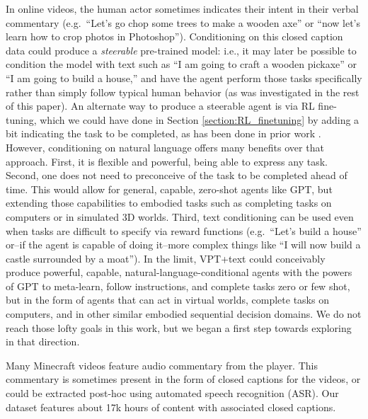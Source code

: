 In online videos, the human actor sometimes indicates their intent in their verbal commentary (e.g.\ ``Let's go chop some trees to make a wooden axe'' or ``now let's learn how to crop photos in Photoshop''). Conditioning on this closed caption data could produce a \emph{steerable} pre-trained model: i.e., it may later be possible to condition the model with text such as ``I am going to craft a wooden pickaxe'' or ``I am going to build a house,'' and have the agent perform those tasks specifically rather than simply follow typical human behavior (as was investigated in the rest of this paper). An alternate way to produce a steerable agent is via RL fine-tuning, which we could have done in Section \ref{section:RL_finetuning} by adding a bit indicating the task to be completed, as has been done in prior work \cite{kanitscheider2021multi}. However, conditioning on natural language offers many benefits over that approach. First, it is flexible and powerful, being able to express any task. Second, one does not need to preconceive of the task to be completed ahead of time. This would allow for general, capable, zero-shot agents like GPT, but extending those capabilities to embodied tasks such as completing tasks on computers or in simulated 3D worlds. Third, text conditioning can be used even when tasks are difficult to specify via reward functions (e.g.\ ``Let's build a house'' or--if the agent is capable of doing it--more complex things like ``I will now build a castle surrounded by a moat''). In the limit, VPT+text could conceivably produce powerful, capable, natural-language-conditional agents with the powers of GPT to meta-learn, follow instructions, and complete tasks zero or few shot, but in the form of agents that can act in virtual worlds, complete tasks on computers, and in other similar embodied sequential decision domains. We do not reach those lofty goals in this work, but we began a first step towards exploring in that direction. 

Many Minecraft videos feature audio commentary from the player. This commentary is sometimes present in the form of closed captions for the videos, or could be extracted post-hoc using automated speech recognition (ASR).\cite{yu2016automatic} Our dataset features about 17k
hours of content with associated closed captions.


